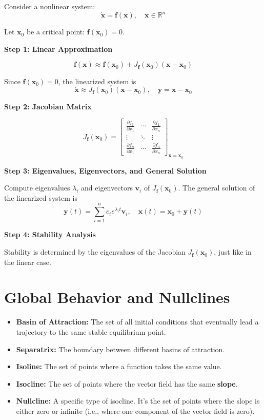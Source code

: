Consider a nonlinear system:
\[
\dot{\mathbf{x}} = \mathbf{f}(\mathbf{x}), \quad \mathbf{x} \in \mathbb{R}^n
\]

Let $\mathbf{x}_0$ be a critical point: $\mathbf{f}(\mathbf{x}_0) = 0$.

\textbf{Step 1: Linear Approximation}

\[
\mathbf{f}(\mathbf{x}) \approx \mathbf{f}(\mathbf{x}_0) + J_{\mathbf{f}}(\mathbf{x}_0)(\mathbf{x} - \mathbf{x}_0)
\]

Since $\mathbf{f}(\mathbf{x}_0) = 0$, the linearized system is
\[
\dot{\mathbf{x}} \approx J_{\mathbf{f}}(\mathbf{x}_0) (\mathbf{x} - \mathbf{x}_0), \quad
\mathbf{y} = \mathbf{x} - \mathbf{x}_0
\]

\textbf{Step 2: Jacobian Matrix}

\[
J_{\mathbf{f}}(\mathbf{x}_0) =
\begin{bmatrix}
\frac{\partial f_1}{\partial x_1} & \cdots & \frac{\partial f_1}{\partial x_n} \\
\vdots & \ddots & \vdots \\
\frac{\partial f_n}{\partial x_1} & \cdots & \frac{\partial f_n}{\partial x_n}
\end{bmatrix}_{\mathbf{x} = \mathbf{x}_0}
\]

\textbf{Step 3: Eigenvalues, Eigenvectors, and General Solution}

Compute eigenvalues $\lambda_i$ and eigenvectors $\mathbf{v}_i$ of $J_{\mathbf{f}}(\mathbf{x}_0)$.
The general solution of the linearized system is
\[
\mathbf{y}(t) = \sum_{i=1}^n c_i e^{\lambda_i t} \mathbf{v}_i, \quad
\mathbf{x}(t) = \mathbf{x}_0 + \mathbf{y}(t)
\]

\textbf{Step 4: Stability Analysis}

Stability is determined by the eigenvalues of the Jacobian $J_{\mathbf{f}}(\mathbf{x}_0)$, just like in the linear case.

\section*{Global Behavior and Nullclines}

\begin{itemize}
  \item \textbf{Basin of Attraction:} The set of all initial conditions that eventually lead a trajectory to the same stable equilibrium point.
  \item \textbf{Separatrix:} The boundary between different basins of attraction.
  \item \textbf{Isoline:} The set of points where a function takes the same value.
  \item \textbf{Isocline:} The set of points where the vector field has the same \textbf{slope}.
  \item \textbf{Nullcline:} A specific type of isocline. It's the set of points where the slope is either zero or infinite (i.e., where one component of the vector field is zero).
\end{itemize}

